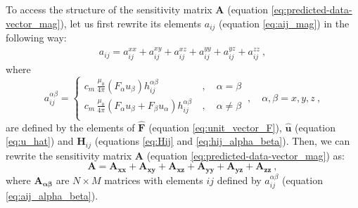 \documentclass[manuscript]{geophysics}
\begin{document}
To access the structure of the sensitivity matrix $\mathbf{A}$ 
(equation \ref{eq:predicted-data-vector_mag}), let us first rewrite its elements 
$a_{ij}$ (equation \ref{eq:aij_mag}) in the following way:
\begin{equation}
	\begin{split}
		a_{ij} = a^{xx}_{ij} + a^{xy}_{ij} + a^{xz}_{ij} + a^{yy}_{ij} + a^{yz}_{ij} + a^{zz}_{ij} \: ,
	\end{split}
	\label{eq:aij_mag_expand}
\end{equation}
where
\begin{equation}
	a^{\alpha\beta}_{ij} = 
	\begin{cases}
		c_{m} \, \frac{\mu_{0}}{4\pi} 
		\left( F_{\alpha} u_{\beta} \right) h^{\alpha\beta}_{ij} \: &, \quad \alpha = \beta \\
		c_{m} \, \frac{\mu_{0}}{4\pi} 
		\left( F_{\alpha} u_{\beta} + F_{\beta} u_{\alpha} \right) h^{\alpha\beta}_{ij} \: &, \quad \alpha \ne \beta \\
	\end{cases}
	\: , \quad \alpha, \beta = x, y, z \: ,
	\label{eq:aij_alpha_beta}
\end{equation}
are defined by the elements of $\hat{\mathbf{F}}$ 
(equation \ref{eq:unit_vector_F}), $\hat{\mathbf{u}}$ (equation \ref{eq:u_hat}) and 
$\mathbf{H}_{ij}$ (equations \ref{eq:Hij} and \ref{eq:hij_alpha_beta}).
Then, we can rewrite the sensitivity matrix $\mathbf{A}$ 
(equation \ref{eq:predicted-data-vector_mag}) as:
\begin{equation}
	\mathbf{A} = \mathbf{A_{xx}} + \mathbf{A_{xy}} + \mathbf{A_{xz}} + 
	\mathbf{A_{yy}} + \mathbf{A_{yz}} + \mathbf{A_{zz}} \: ,
	\label{eq:A_expand}
\end{equation}
where $\mathbf{A_{\boldsymbol{\alpha\beta}}}$ are $N \times M$ matrices with elements 
$ij$ defined by $a^{\alpha\beta}_{ij}$ (equation \ref{eq:aij_alpha_beta}).
\end{document}
